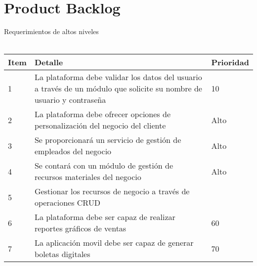\chapter{Product Backlog}
Requerimientos de altos niveles
\\\\

\begin{table}[htbp]
	\begin{center}
		\begin{tabular}{|p{0.8cm} | p{12cm} | p{2cm} |}
			\hline
			Item & Detalle & Prioridad \\
			\hline
			1 & La plataforma debe validar los datos del usuario a través de un módulo que solicite su nombre de usuario y contraseña & 10 \\
			\hline
			2 & La plataforma debe ofrecer opciones de personalización del negocio del cliente & Alto  \\
			\hline
			3 & Se proporcionará un servicio de gestión de empleados del negocio & Alto  \\
			\hline
			4 & Se contará con un módulo de gestión de recursos materiales del negocio & Alto  \\
			\hline
			5 & Gestionar los recursos de negocio a través de operaciones CRUD &  \\
			\hline	
			6 & La plataforma debe ser capaz de realizar reportes gráficos de ventas & 60 \\
			\hline
			7 & La aplicación movil debe ser capaz de generar boletas digitales & 70 \\
			\hline
		\end{tabular}
	\end{center}
\end{table}
